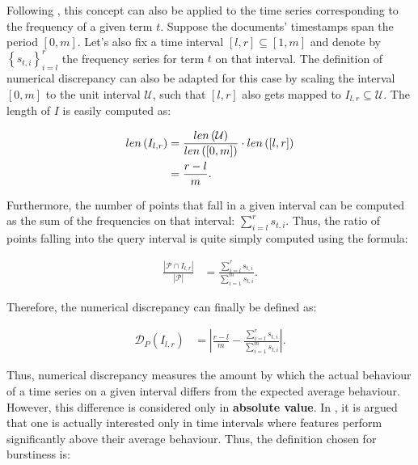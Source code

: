 Following \cite{Lappas:2009:BSD:1557019.1557075}, this concept can also be applied to the time series corresponding to the frequency of a given term $t$. Suppose the documents' timestamps span the period $\left[ 0, m \right]$. Let's also fix a time interval $\left[ l, r \right] \subseteq \left[ 1, m \right]$ and denote by $\left\{ s_{t,i} \right\}_{i=l}^{r}$ the frequency series for term $t$ on that interval. The definition of numerical discrepancy can also be adapted for this case by scaling the interval $\left[ 0, m \right]$ to the unit interval $\mathcal{U}$, such that $\left[ l, r \right]$ also gets mapped to $I_{l,r} \subseteq \mathcal{U}$. The length of $I$ is easily computed as:

\begin{align}
\label{eq:nd-interval-length}
len \left( I_{l,r} \right) &= \frac{len \left( \mathcal{U} \right)}{len \left( \left[ 0, m \right] \right)} \cdot len \left( \left[ l, r \right] \right) \\
	&= \frac{r - l}{m}. \notag
\end{align}

Furthermore, the number of points that fall in a given interval can be computed as the sum of the frequencies on that interval: $\displaystyle \sum_{i=l}^{r} s_{t,i}$. Thus, the ratio of points falling into the query interval is quite simply computed using the formula:

\begin{align}
\label{eq:nd-point-ratio}
\frac{\left| \mathcal{P} \cap I_{l,r} \right|}{\left| \mathcal{P} \right|} &= \frac{\sum_{i=l}^{r} s_{t,i}}{\sum_{i=1}^{m} s_{t,i}}.
\end{align}

Therefore, the numerical discrepancy can finally be defined as:

\begin{align}
\label{eq:nd-time-series-absolute}
\mathcal{D}_{P} \left( I_{l,r} \right) &= \left| \frac{r - l}{m} - \frac{\sum_{i=l}^{r} s_{t,i}}{\sum_{i=1}^{m} s_{t,i}} \right|.
\end{align}

Thus, numerical discrepancy measures the amount by which the actual behaviour of a time series on a given interval differs from the expected average behaviour. However, this difference is considered only in \textbf{absolute value}. In \cite{Lappas:2009:BSD:1557019.1557075}, it is argued that one is actually interested only in time intervals where features perform significantly above their average behaviour. Thus, the definition chosen for burstiness is:

